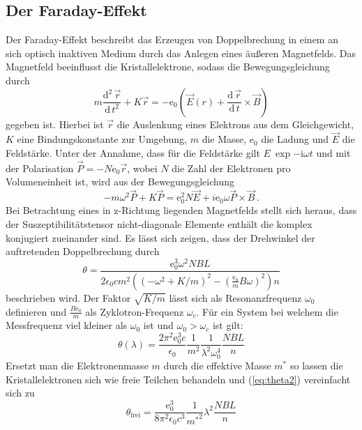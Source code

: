 \subsection{Der Faraday-Effekt}
Der Faraday-Effekt beschreibt das Erzeugen von Doppelbrechung in einem an sich optisch inaktiven Medium durch das Anlegen eines äußeren Magnetfelds. Das Magnetfeld beeinflusst die Kristallelektrone, sodass die Bewegungsgleichung durch
\begin{equation}
  m\frac{\text{d}^2\,\vec{r}}{\text{d}\,t^2}+K\vec{r}=-\text{e}_0\left(\vec{E}(r)+\frac{\text{d}\,\vec{r}}{\text{d}\,t}\times\vec{B}\right)
\end{equation}
gegeben ist. Hierbei ist $\vec{r}$ die Auslenkung eines Elektrons aus dem Gleichgewicht, $K$ eine Bindungskonstante zur Umgebung, $m$ die Masse, e$_0$ die Ladung und $\vec{E}$ die Feldstärke.
Unter der Annahme, dass für die Feldstärke gilt $E~\exp{-\text{i}\omega t}$ und mit der Polarisation $\vec{P}=-N\text{e}_0\vec{r}$, wobei $N$ die Zahl der Elektronen pro Volumeneinheit ist, wird aus der Bewegungsgleichung
\begin{equation}
-m\omega^2\vec{P}+K\vec{P}=\text{e}_0^2N\vec{E}+i\text{e}_0\omega\vec{P}\times\vec{B}\,.
\end{equation}
Bei Betrachtung eines in z-Richtung liegenden Magnetfelds stellt sich heraus, dass der Suszeptibilitätstensor nicht-diagonale Elemente enthält die komplex konjugiert zueinander sind.
Es lässt sich zeigen, dass der Drehwinkel der auftretenden Doppelbrechung durch
\begin{equation}
\theta=\frac{\text{e}_0^3\omega^2NBL}{2\epsilon_0cm^2\left(\left(-\omega^2+K/m\right)^2-\left(\frac{\text{e}_0}{m}B\omega\right)^2\right)n}
\end{equation}
beschrieben wird. Der Faktor $\sqrt{K/m}$ lässt sich als Resonanzfrequenz $\omega_0$ definieren und $\frac{B\text{e}_0}{m}$ als Zyklotron-Frequenz $\omega_c$. Für ein System bei welchem die Messfrequenz viel kleiner als $\omega_0$ ist und $\omega_0>\omega_c$ ist gilt:
\begin{equation}
\theta(\lambda)=\frac{2\pi^2\text{e}_0^3c}{\epsilon_0}\frac{1}{m^2}\frac{1}{\lambda^2\omega_0^4}\frac{NBL}{n}
\label{eq:theta2}
\end{equation}
Ersetzt man die Elektronenmasse $m$ durch die effektive Masse $m^*$ so lassen die Kristallelektronen sich wie freie Teilchen behandeln und (\ref{eq:theta2}) vereinfacht sich zu
\begin{equation}
\theta_\text{frei}=\frac{\text{e}_0^3}{8\pi^2\epsilon_0c^3}\frac{1}{{m^*}^2}\lambda^2\frac{NBL}{n}
\end{equation}
